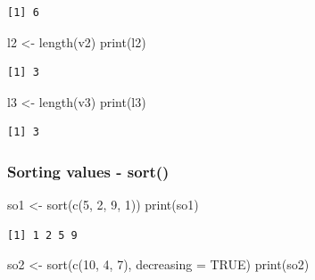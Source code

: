 \documentclass[
  letterpaper,
  DIV=11,
  numbers=noendperiod]{scrartcl}
\newenvironment{Shaded}{\begin{snugshade}}{\end{snugshade}}
\newcommand{\AttributeTok}[1]{\textcolor[rgb]{0.40,0.45,0.13}{#1}}
\newcommand{\ConstantTok}[1]{\textcolor[rgb]{0.56,0.35,0.01}{#1}}
\newcommand{\DecValTok}[1]{\textcolor[rgb]{0.68,0.00,0.00}{#1}}
\newcommand{\FunctionTok}[1]{\textcolor[rgb]{0.28,0.35,0.67}{#1}}
\newcommand{\NormalTok}[1]{\textcolor[rgb]{0.00,0.23,0.31}{#1}}
\newcommand{\OtherTok}[1]{\textcolor[rgb]{0.00,0.23,0.31}{#1}}
\begin{document}
\begin{verbatim}
[1] 6
\end{verbatim}

\begin{Shaded}
\begin{Highlighting}[]
\NormalTok{l2 }\OtherTok{\textless{}{-}} \FunctionTok{length}\NormalTok{(v2)}
\FunctionTok{print}\NormalTok{(l2)}
\end{Highlighting}
\end{Shaded}

\begin{verbatim}
[1] 3
\end{verbatim}

\begin{Shaded}
\begin{Highlighting}[]
\NormalTok{l3 }\OtherTok{\textless{}{-}} \FunctionTok{length}\NormalTok{(v3)}
\FunctionTok{print}\NormalTok{(l3)}
\end{Highlighting}
\end{Shaded}

\begin{verbatim}
[1] 3
\end{verbatim}

\subsubsection{Sorting values - sort()}\label{sorting-values---sort}

\begin{Shaded}
\begin{Highlighting}[]
\NormalTok{so1 }\OtherTok{\textless{}{-}} \FunctionTok{sort}\NormalTok{(}\FunctionTok{c}\NormalTok{(}\DecValTok{5}\NormalTok{, }\DecValTok{2}\NormalTok{, }\DecValTok{9}\NormalTok{, }\DecValTok{1}\NormalTok{))}
\FunctionTok{print}\NormalTok{(so1)}
\end{Highlighting}
\end{Shaded}

\begin{verbatim}
[1] 1 2 5 9
\end{verbatim}

\begin{Shaded}
\begin{Highlighting}[]
\NormalTok{so2 }\OtherTok{\textless{}{-}} \FunctionTok{sort}\NormalTok{(}\FunctionTok{c}\NormalTok{(}\DecValTok{10}\NormalTok{, }\DecValTok{4}\NormalTok{, }\DecValTok{7}\NormalTok{), }\AttributeTok{decreasing =} \ConstantTok{TRUE}\NormalTok{)}
\FunctionTok{print}\NormalTok{(so2)}
\end{Highlighting}
\end{Shaded}
\end{document}
